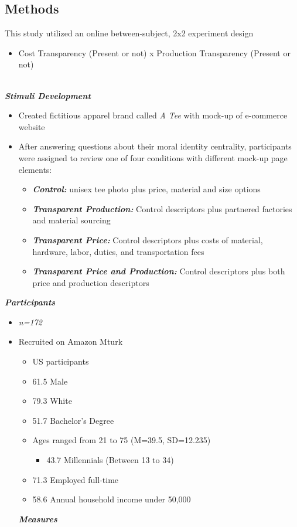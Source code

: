 \documentclass[a0,portrait]{a0poster}
\begin{document}
\begin{minipage}[c]{\linewidth}
\begin{framed}
\begin{multicols}{2}
\section*{Methods}
\color{Black}
 This study utilized an online between-subject, 2x2 experiment design	
\begin{itemize}
    \item Cost Transparency (Present or not) x Production Transparency (Present or not) 
\end{itemize}
\\
\color{Maroon}
\textbf{\emph{Stimuli Development}}
\color{Black}
\begin{itemize}
    \item Created fictitious apparel brand called \textit{A\text{\_} Tee} with mock-up of e-commerce website
    \item After answering questions about their moral identity centrality, participants were assigned to review one of four conditions with different mock-up page elements:
    \begin{itemize}
        \item \textbf{\emph{Control:}} unisex tee photo plus price, material and size options
        \item \textbf{\emph{Transparent Production:}} Control descriptors plus partnered factories and material sourcing
         \item \textbf{\emph{Transparent Price:}} Control descriptors plus costs of material, hardware, labor, duties, and transportation fees
         \item \textbf{\emph{Transparent Price and Production:}} Control descriptors plus both price and production descriptors
    \end{itemize}
\end{itemize}
\color{Maroon}
\textbf{\emph{Participants}}
\color{Black}
\begin{itemize}
\item \textit{n=172}
\item Recruited on Amazon Mturk
\begin{itemize}
    \item US participants 
    \item 61.5\text{\%} Male
    \item 79.3\text{\%} White
    \item 51.7\text{\%} Bachelor's Degree
    \item Ages ranged from 21 to 75 (M=39.5, SD=12.235)
    \begin{itemize}
        \item 43.7\text{\%} Millennials (Between 13 to 34)
    \end{itemize}
    \item 71.3\text{\%} Employed full-time
    \item 58.6\text{\%} Annual household income under \text{\$}50,000
\end{itemize}
\color{Maroon}
\textbf{\emph{Measures}}
\color{Black}



\end{itemize}
\end{multicols}
\end{framed}
\end{minipage}
\end{document}
